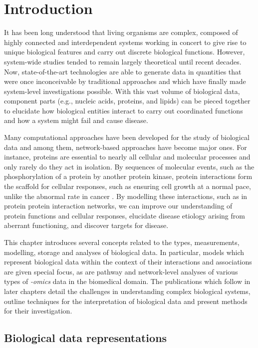 \chapter{Introduction}
\label{ch:intro}

It has been long understood that living organisms are complex, composed of highly connected and interdependent systems working in concert to give rise to unique biological features and carry out discrete biological functions. However, system-wide studies tended to remain largely theoretical until recent decades. Now, state-of-the-art technologies are able to generate data in quantities that were once inconceivable by traditional approaches and which have finally made system-level investigations possible. With this vast volume of biological data, component parts (e.g., nucleic acids, proteins, and lipids) can be pieced together to elucidate how biological entities interact to carry out coordinated functions and how a system might fail and cause disease. 

Many computational approaches have been developed for the study of biological data and among them, network-based approaches have become major ones. For instance, proteins are essential to nearly all cellular and molecular processes and only rarely do they act in isolation. By sequences of molecular events, such as the phosphorylation of a protein by another protein kinase, protein interactions form the scaffold for cellular responses, such as ensuring cell growth at a normal pace, unlike the abnormal rate in cancer \parencite{silverbush2019}. By modelling these interactions, such as in protein protein interaction networks, we can improve our understanding of protein functions and cellular responses, elucidate disease etiology arising from aberrant functioning, and discover targets for disease. 

This chapter introduces several concepts related to the types, measurements, modelling, storage and analyses of biological data. In particular, models which represent biological data within the context of their interactions and associations are given special focus, as are pathway and network-level analyses of various types of \textit{-omics} data in the biomedical domain. The publications which follow in later chapters detail the challenges in understanding complex biological systems, outline techniques for the interpretation of biological data and present methods for their investigation.

\section{Biological data representations}
\label{intro_1}

